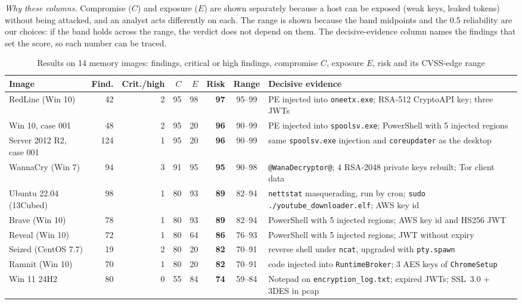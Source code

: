 \textit{Why these columns.} Compromise ($C$) and exposure ($E$) are shown separately because a host can be
exposed (weak keys, leaked tokens) without being attacked, and an analyst acts differently on each. The range
is shown because the band midpoints and the 0.5 reliability are our choices: if the band holds across the range,
the verdict does not depend on them. The decisive-evidence column names the findings that set the score, so each
number can be traced.

\begin{table}[t]
\centering
\caption{Results on 14 memory images: findings, critical or high findings, compromise $C$, exposure $E$, risk and its CVSS-edge range}
\label{tab:dumps}
\footnotesize
\begin{tabularx}{\textwidth}{@{}lrrrrrcX@{}}
\toprule
Image & Find. & Crit./high & $C$ & $E$ & Risk & Range & Decisive evidence\\
\midrule
RedLine (Win 10) & 42 & 2 & 95 & 98 & \textbf{97} & 95--99 & PE injected into \texttt{oneetx.exe}; RSA-512 CryptoAPI key; three JWTs\\
Win 10, case 001 & 48 & 2 & 95 & 20 & \textbf{96} & 90--99 & PE injected into \texttt{spoolsv.exe}; PowerShell with 5 injected regions\\
Server 2012 R2, case 001 & 124 & 1 & 95 & 20 & \textbf{96} & 90--99 & same \texttt{spoolsv.exe} injection and \texttt{coreupdater} as the desktop\\
WannaCry (Win 7) & 94 & 3 & 91 & 95 & \textbf{95} & 90--98 & \texttt{@WanaDecryptor@}; 4 RSA-2048 private keys rebuilt; Tor client data\\
Ubuntu 22.04 (13Cubed) & 98 & 1 & 80 & 93 & \textbf{89} & 82--94 & \texttt{nettstat} masquerading, run by cron; \texttt{sudo ./youtube\_downloader.elf}; AWS key id\\
Brave (Win 10) & 78 & 1 & 80 & 93 & \textbf{89} & 82--94 & PowerShell with 5 injected regions; AWS key id and HS256 JWT\\
Reveal (Win 10) & 72 & 1 & 80 & 64 & \textbf{86} & 76--93 & PowerShell with 5 injected regions; JWT without expiry\\
Seized (CentOS 7.7) & 19 & 2 & 80 & 20 & \textbf{82} & 70--91 & reverse shell under \texttt{ncat}, upgraded with \texttt{pty.spawn}\\
Ramnit (Win 10) & 70 & 1 & 80 & 20 & \textbf{82} & 70--91 & code injected into \texttt{RuntimeBroker}; 3 AES keys of \texttt{ChromeSetup}\\
Win 11 24H2 & 80 & 0 & 55 & 84 & \textbf{74} & 59--84 & Notepad on \texttt{encryption\_log.txt}; expired JWTs; SSL~3.0 + 3DES in pcap\\

\end{tabularx}
\end{table}
